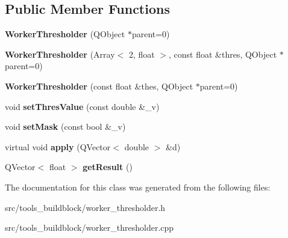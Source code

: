 \subsection*{Public Member Functions}
\begin{DoxyCompactItemize}
\item 
\mbox{\label{classWorkerThresholder_a35cbae7e9e8de11ba7e45b8afafb9d38}} 
{\bfseries Worker\+Thresholder} (Q\+Object $\ast$parent=0)
\item 
\mbox{\label{classWorkerThresholder_a3399c8df444f36872f081049b3561320}} 
{\bfseries Worker\+Thresholder} (Array$<$ 2, float $>$, const float \&thres, Q\+Object $\ast$parent=0)
\item 
\mbox{\label{classWorkerThresholder_a40ff8486408c1da75630055f85e2c2db}} 
{\bfseries Worker\+Thresholder} (const float \&thes, Q\+Object $\ast$parent=0)
\item 
\mbox{\label{classWorkerThresholder_ac7890d8abc4f09aa820259485ab7143e}} 
void {\bfseries set\+Thres\+Value} (const double \&\+\_\+v)
\item 
\mbox{\label{classWorkerThresholder_a996b4c40e4b94c53a087263f44aedfc4}} 
void {\bfseries set\+Mask} (const bool \&\+\_\+v)
\item 
\mbox{\label{classWorkerThresholder_a37f2dd82a4606065c60f3c95951e7b60}} 
virtual void {\bfseries apply} (Q\+Vector$<$ double $>$ \&d)
\item 
\mbox{\label{classWorkerThresholder_a3c38c0c582ce9a7976d39127c92ff359}} 
Q\+Vector$<$ float $>$ {\bfseries get\+Result} ()
\end{DoxyCompactItemize}


The documentation for this class was generated from the following files\+:\begin{DoxyCompactItemize}
\item 
src/tools\+\_\+buildblock/worker\+\_\+thresholder.\+h\item 
src/tools\+\_\+buildblock/worker\+\_\+thresholder.\+cpp\end{DoxyCompactItemize}
